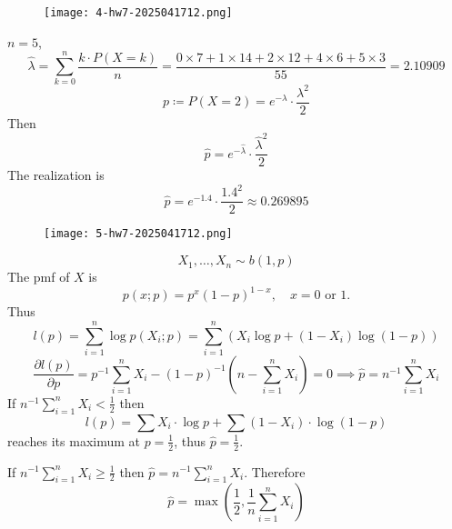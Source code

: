 \begin{exercise}
\begin{figure}[H]
\centering
\texttt{[image: 4-hw7-2025041712.png]}
\label{}
\end{figure}
\end{exercise}
$n=5$,
\[
\widehat{\lambda}=\sum_{k=0}^{n} \frac{k\cdot P(X=k)}{n}=\frac{0\times7+1\times14+2\times12+4\times6+5\times3}{55}=2.10909
\]
\[
p\coloneqq P(X=2)=e^{ -\lambda }\cdot\frac{\lambda^{2}}{2}
\]
Then
\[
\widehat{p}=e^{ -\widehat{\lambda} }\cdot\frac{\widehat{\lambda}^2}{2}
\]
The realization is
\[
\widehat{p}=e^{ -1.4 }\cdot\frac{1.4^2}{2}\approx 0.269895
\]
\begin{exercise}
\begin{figure}[H]
\centering
\texttt{[image: 5-hw7-2025041712.png]}
\label{}
\end{figure}
\end{exercise}
\[
X_1,\dots,X_n\sim b(1,p)
\]
The pmf of $X$ is
\[
p(x ; p)=p^x(1-p)^{1-x}, \quad x=0 \text { or } 1 .
\]
Thus
\[
l(p)=\sum_{i=1}^{n} \log p(X_i;p)=\sum_{i=1}^{n} (X_i\log p+(1-X_i)\log(1-p))
\]
\[
\frac{ \partial l(p) }{ \partial p }= p ^{-1}\sum_{i=1}^{n} X_i-(1-p)^{-1}\left( n-\sum_{i=1}^{n} X_i \right)=0\implies \widehat{p}=n^{-1}\sum_{i=1}^{n} X_i
\]
If $n^{-1}\sum_{i=1}^{n}X_i<\frac{1}{2}$ then
\[
l(p)=\sum X_i\cdot \log p+\sum(1-X_i)\cdot \log(1-p)
\]
reaches its maximum at $p=\frac{1}{2}$, thus $\widehat{p}=\frac{1}{2}$.

If $n^{-1}\sum_{i=1}^{n}X_i\geq\frac{1}{2}$ then $\widehat{p}=n^{-1}\sum_{i=1}^{n}X_i$. Therefore
\[
\widehat{p}=\max\left( \frac{1}{2},\frac{1}{n}\sum_{i=1}^{n} X_i \right)
\]